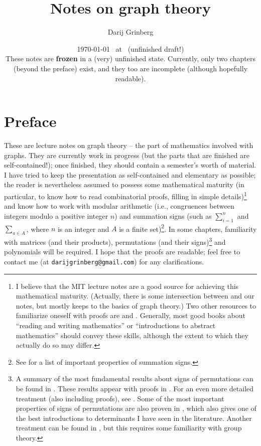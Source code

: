 \documentclass[numbers=enddot,12pt,final,onecolumn,notitlepage]{scrartcl}%
\theoremstyle{definition}
\let\sumnonlimits\sum
\renewcommand{\sum}{\sumnonlimits\limits}
\begin{document}
\title{Notes on graph theory}
\author{Darij Grinberg}
\date{
\today\ 
at \DTMcurrenttime\ 
(unfinished draft!)\\
These notes are \textbf{frozen} in a (very) unfinished state. Currently, only
two chapters (beyond the preface) exist, and they too are incomplete
(although hopefully readable).}
\maketitle
\tableofcontents

\section{Preface}

These are lecture notes on graph theory -- the part of mathematics
involved with graphs. They are currently work in
progress (but the parts that are finished are self-contained!);
once finished, they should contain a semester's worth of
material. I have tried to keep the presentation as self-contained and
elementary as possible; the reader is nevertheless assumed to possess
some mathematical maturity (in particular, to know how to read
combinatorial proofs, filling in simple details)\footnote{I believe
that the MIT lecture notes \cite{LeLeMe16} are a good source for
achieving this mathematical maturity. (Actually, there is some
intersection between \cite[Chapters 10 and 12]{LeLeMe16} and our
notes, but \cite{LeLeMe16} mostly keeps to the basics of graph
theory.)
Two other resources to familiarize oneself with proofs are
\cite{Hammac15} and \cite{Day-proofs}.
Generally, most good books about ``reading and
writing mathematics'' or ``introductions to abstract mathematics''
should convey these skills, although the extent to which they actually
do so may differ.}
and know how to work
with modular arithmetic (i.e., congruences between integers modulo a
positive integer $n$) and summation signs (such as $\sum_{i=1}^n$ and
$\sum_{a \in A}$, where $n$ is an integer and $A$ is a finite
set)\footnote{See \cite[\S 1.4]{detnotes} for a list of important
properties of summation signs.}.
In some chapters, familiarity with matrices (and their products),
permutations (and their signs)\footnote{A summary of the most
fundamental results about signs of permutations can be found in
\cite[\S 8.1]{LaNaSc16}. These results appear with proofs in
\cite[Chapter 6.B]{Day-proofs}. For an even more detailed treatment
(also including proofs),
see \cite[\S 5.1--5.3]{detnotes}. Some of the most important
properties of signs of permutations are also proven in
\cite[Appendix B]{Strick13}, which also gives one of the best
introductions to determinants I have seen in the literature.
Another treatment can be found in
\cite{Conrad-sign}, but this requires some familiarity with group
theory.}
and polynomials will be required.
I hope that the proofs are readable; feel free to contact me (at
\texttt{darijgrinberg@gmail.com}) for any clarifications.
\end{document}
